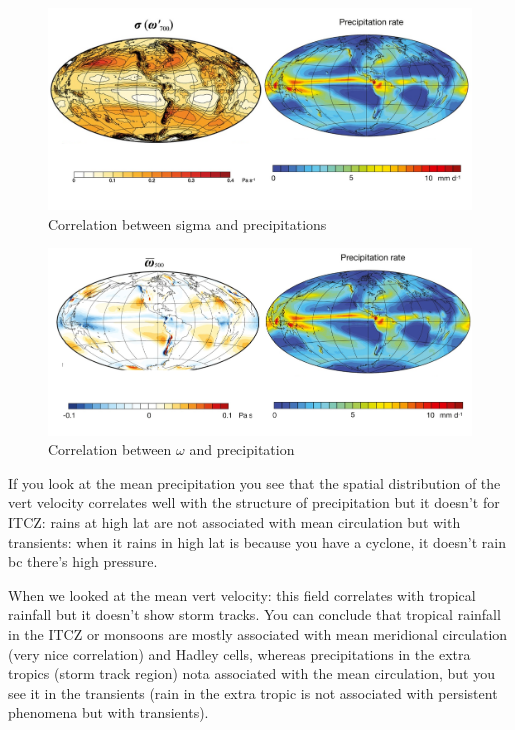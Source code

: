 \begin{figure}[htpb]
    \centering
    \includegraphics[width=0.5\linewidth]{uploads/sigma and precipitation.png}
    \caption{Correlation between sigma and precipitations}
    \label{fig:sigma and precipit}
\end{figure}
\begin{figure}[htpb]
    \centering
    \includegraphics[width=0.5\linewidth]{uploads/omega and precipit.png}
    \caption{Correlation between $\omega$ and precipitation}
    \label{fig:omega and precipit}
\end{figure}



If you look at the mean precipitation you see that the spatial distribution of the vert velocity correlates well with the structure of precipitation but it doesn't for ITCZ: rains at high lat are not associated with mean circulation but with transients: when it rains in high lat is because you have a cyclone, it doesn't rain bc there's high pressure. 

When we looked at the mean vert velocity: this field correlates with tropical rainfall but it doesn't show storm tracks. You can conclude that tropical rainfall in the ITCZ or monsoons are mostly associated with mean meridional circulation (very nice correlation) and Hadley cells, whereas precipitations in the extra tropics (storm track region) nota associated with the mean circulation, but you see it in the transients (rain in the extra tropic is not associated with persistent phenomena but with transients). 




